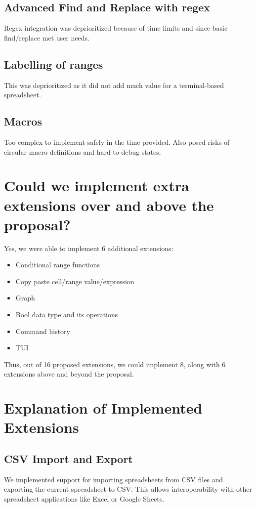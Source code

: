 \documentclass{article}
\begin{document}
\subsection{Advanced Find and Replace with regex}
Regex integration was deprioritized because of time limits and since basic find/replace met user needs.

\subsection{Labelling of ranges}
This was deprioritized as it did not add much value for a terminal-based spreadsheet.

\subsection{Macros}
Too complex to implement safely in the time provided. Also posed risks of circular macro definitions and hard-to-debug states.

\section{Could we implement extra extensions over and above the proposal?}

Yes, we were able to implement 6 additional extensions:
\begin{itemize}


\item Conditional range functions


\item Copy paste cell/range value/expression


\item Graph

\item Bool data type and its operations


\item Command history


\item TUI
\end{itemize}

Thus, out of 16 proposed extensions, we could implement 8, along with 6 extensions above and beyond the proposal.

\section{Explanation of Implemented Extensions}

\subsection{CSV Import and Export}
We implemented support for importing spreadsheets from CSV files and exporting the current spreadsheet to CSV. This allows interoperability with other spreadsheet applications like Excel or Google Sheets.
\end{document}
